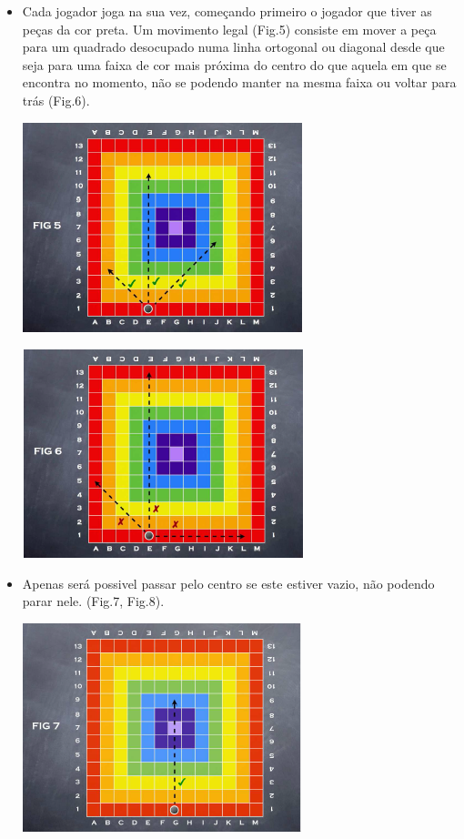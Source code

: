 \documentclass[a4paper]{article}
\begin{document}
\begin{itemize}
	\item Cada jogador joga na sua vez, começando primeiro o jogador que tiver as peças da cor preta. Um movimento legal (Fig.5) consiste em mover a peça para um quadrado desocupado numa linha ortogonal ou diagonal desde que seja para uma faixa de cor mais próxima do centro do que aquela em que se encontra no momento, não se podendo manter na mesma faixa ou voltar para trás (Fig.6).

\begin{center}
\includegraphics[scale=0.9]{fig5.png}\linebreak\linebreak 
\end{center}

\begin{center}
\includegraphics[scale=0.9]{fig6.png}\linebreak\linebreak 
\end{center}
	
	\newpage
	\item Apenas será possivel passar pelo centro se este estiver vazio, não podendo parar nele. (Fig.7, Fig.8).


\begin{center}
\includegraphics[scale=0.9]{fig7.png}\linebreak\linebreak 
\end{center}


\end{itemize}
\end{document}
